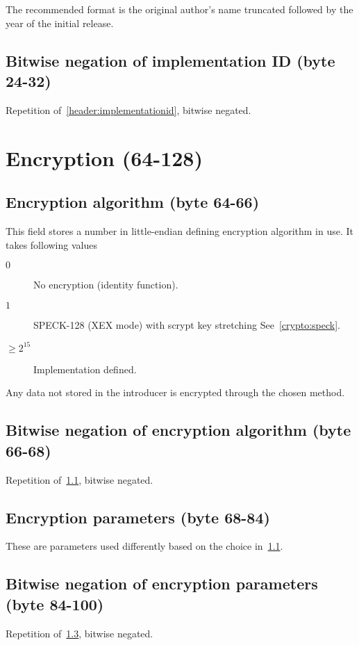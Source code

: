 \documentclass[11pt,a4paper]{report}
\begin{document}
        The recommended format is the original author's name truncated
        followed by the year of the initial release.

        \subsection{Bitwise negation of implementation ID (byte 24-32)}
        Repetition of~\ref{header:implementationid}, bitwise negated.

    \section{Encryption (64-128)}
        \subsection{Encryption algorithm (byte 64-66)}
        \label{header:encryption}
        This field stores a number in little-endian defining encryption
        algorithm in use. It takes following values

        \begin{description}
            \item [$0$] No encryption (identity function).
            \item [$1$] SPECK-128 (XEX mode) with scrypt key stretching
                See~\ref{crypto:speck}.
            \item [$\geq 2^{15}$] Implementation defined.
        \end{description}

        Any data not stored in the introducer is encrypted through the chosen method.

        \subsection{Bitwise negation of encryption algorithm (byte 66-68)}
        Repetition of~\ref{header:encryption}, bitwise negated.

        \subsection{Encryption parameters (byte 68-84)}
        \label{header:encryptionparams}
        These are parameters used differently based on the choice
        in~\ref{header:encryption}.

        \subsection{Bitwise negation of encryption parameters (byte 84-100)}
        Repetition of~\ref{header:encryptionparams}, bitwise negated.
\end{document}
